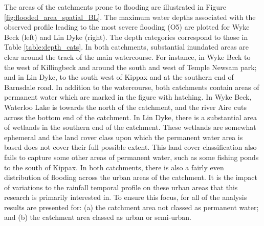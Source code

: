 \documentclass[APA,Times2COL]{WileyNJDv5}
\begin{document}
The areas of the catchments prone to flooding are illustrated in Figure \ref{fig:flooded_area_spatial_BL}. The maximum water depths associated with the observed profile leading to the most severe flooding (O5) are plotted for Wyke Beck (left) and Lin Dyke (right). The depth categories correspond to those in Table \ref{table:depth_cats}. In both catchments, substantial inundated areas are clear around the track of the main watercourse. For instance, in Wyke Beck to the west of Killingbeck and around the south and west of Temple Newsam park; and in Lin Dyke, to the south west of Kippax and at the southern end of Barnsdale road. In addition to the watercourse, both catchments contain areas of permanent water which are marked in the figure with hatching. In Wyke Beck, Waterloo Lake is towards the north of the catchment, and the river Aire cuts across the bottom end of the catchment. In Lin Dyke, there is a substantial area of wetlands in the southern end of the catchment. These wetlands are somewhat ephemeral and the land cover class upon which the permanent water area is based does not cover their full possible extent. This land cover classification also fails to capture some other areas of permanent water, such as some fishing ponds to the south of Kippax. In both catchments, there is also a fairly even distribution of flooding across the urban areas of the catchment. It is the impact of variations to the rainfall temporal profile on these urban areas that this research is primarily interested in. To ensure this focus, for all of the analysis results are presented for: (a) the catchment area not classed as permanent water; and (b) the catchment area classed as urban or semi-urban.


\end{document}
